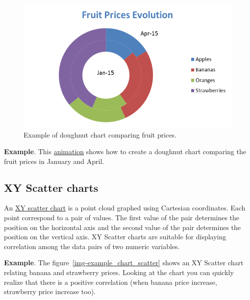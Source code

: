 \begin{figure}[htbp]
\begin{center}
\includegraphics[scale=0.7]{../img/example_chart_doughnut.png}
\end{center}
\caption{Example of doughnut chart comparing fruit prices.}
\label{img-example_chart_doughnut}
\end{figure}

\textbf{Example}. This \href{http://aprendeconalf.es/office/excel/manual/img/example_chart_doughnut.gif}{animation} shows how to create a doughnut chart comparing the fruit prices in January and April.

\subsection{XY Scatter charts}\hypertarget{xy-scatter-charts}{}\label{xy-scatter-charts}

An \href{https://en.wikipedia.org/wiki/Scatter\_plot}{XY scatter chart} is a point cloud graphed using Cartesian coordinates. Each point correspond to a pair of values. The first value of the pair determines the position on the horizontal axis and the second value of the pair determines the position on the vertical axis. XY Scatter charts are suitable for displaying correlation among the data pairs of two numeric variables.

\textbf{Example}. The figure~\ref{img-example_chart_scatter} shows an XY Scatter chart relating banana and strawberry prices. Looking at
the chart you can quickly realize that there is a positive correlation (when banana price increase, strawberry price increase too).

